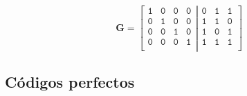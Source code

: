 \documentclass[es,apuntes]{uah}
\begin{document}
\begin{displaymath}
	\mathbf{G} = \left [ \begin{array}{cccc}
	\mathtt{1} & \mathtt{0} & \mathtt{0} & \mathtt{0}\\
	\mathtt{0} & \mathtt{1} & \mathtt{0} & \mathtt{0}\\
	\mathtt{0} & \mathtt{0} & \mathtt{1} & \mathtt{0}\\
	\mathtt{0} & \mathtt{0} & \mathtt{0} & \mathtt{1}\\	 	
 \end{array}
 \left |
  \begin{array}{ccc}
	\mathtt{0} & \mathtt{1} & \mathtt{1} \\
	\mathtt{1} & \mathtt{1} & \mathtt{0} \\
	\mathtt{1} & \mathtt{0} & \mathtt{1} \\
	\mathtt{1} & \mathtt{1} & \mathtt{1} \\	 	
 \end{array}
 \right.
	\right ]
\end{displaymath}


 

%
%
%




\subsection{Códigos perfectos}
\end{document}
